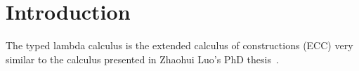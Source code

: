 \section{Introduction}

The typed lambda calculus is the extended calculus of constructions (ECC) very
similar to the calculus presented in Zhaohui Luo's PhD thesis~\cite{luo1990}.
